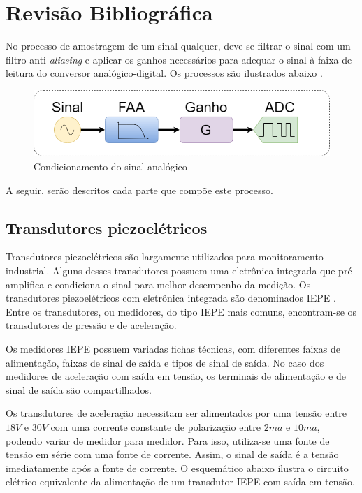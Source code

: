 \documentclass[
	12pt,				%
	openright,			%
	twoside,			%
	a4paper,			%
	english,			%
	french,				%
	spanish,			%
	brazil,				%
	]{abntex2}
\begin{document}


\chapter{Revisão Bibliográfica}
	No processo de amostragem de um sinal qualquer, deve-se filtrar o sinal com
	um filtro anti-\textit{aliasing} e aplicar os ganhos necessários para adequar
	o sinal à faixa de leitura do conversor analógico-digital. Os processos são
	ilustrados abaixo \cite{artElectronics}.

	\begin{figure}[H]
		\centering
		\includegraphics[width=\linewidth]{../Fotos/Diagramas/sinalFaaADC/sinalFaaADC.png}
		\caption{Condicionamento do sinal analógico}
		\label{fig:condicionamentoSinal}
	\end{figure}

	A seguir, serão descritos cada parte que compõe este processo.

	\section{Transdutores piezoelétricos}
		Transdutores piezoelétricos são largamente utilizados para
		monitoramento industrial. Alguns desses transdutores possuem uma eletrônica
		integrada que pré-amplifica e condiciona o sinal para melhor
		desempenho da medição. Os transdutores piezoelétricos com eletrônica
		integrada são denominados IEPE \cite{iepeCircuit}. Entre os transdutores, ou medidores, do tipo IEPE
		mais comuns, encontram-se os transdutores de pressão e de
		aceleração.

		Os medidores IEPE possuem variadas fichas técnicas, com diferentes
		faixas de alimentação, faixas de sinal de saída e tipos de sinal de
		saída. No caso dos medidores de aceleração com saída em tensão, os
		terminais de alimentação e de sinal de saída são compartilhados.

		Os transdutores de aceleração necessitam ser alimentados por uma
		tensão entre $18V$ e $30V$ com uma corrente constante de polarização
		entre $2ma$ e $10ma$, podendo variar de medidor para medidor. Para
		isso, utiliza-se uma fonte de tensão em série com uma fonte de
		corrente. Assim, o sinal de saída é a tensão imediatamente após a
		fonte de corrente. O esquemático abaixo ilustra o circuito elétrico
		equivalente da alimentação de um transdutor IEPE com saída em
		tensão.
\end{document}
